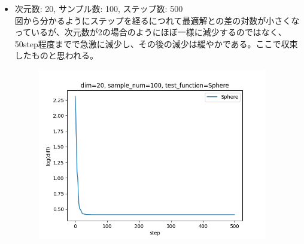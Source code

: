 \documentclass{jsarticle}
\begin{document}
\begin{enumerate}
\begin {itemize}
\begin{figure}[H]
                \end{figure}
            \item 次元数: 20, サンプル数: 100, ステップ数: 500 \\
                図から分かるようにステップを経るにつれて最適解との差の対数が小さくなっているが、次元数が2の場合のようにほぼ一様に減少するのではなく、50step程度までで急激に減少し、その後の減少は緩やかである。ここで収束したものと思われる。\\
                \begin{figure}[H]
                \includegraphics [width=10cm] {./result/Sphere_N_20.png}
                \end{figure}


\end{itemize}
\end{enumerate}
\end{document}
